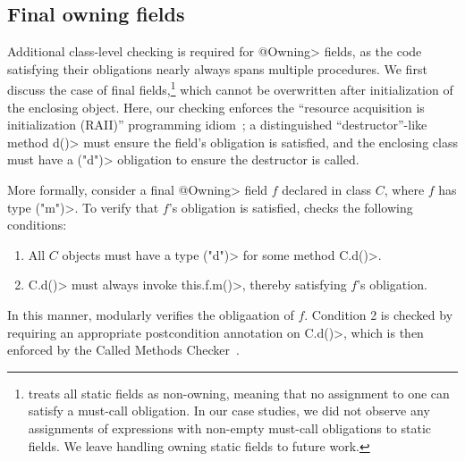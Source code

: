 

\subsection{Final owning fields}
\label{sec:owning-fields}

  Additional class-level checking is required for \<@Owning>
  fields, as the code
  satisfying their \MustCall obligations nearly always spans multiple
  procedures.  We first discuss the case of final fields,\footnote{\Tool
    treats all static fields as non-owning, meaning that no assignment to one
    can satisfy a must-call obligation. In our case studies, we did
    not observe any assignments of expressions with non-empty must-call obligations
    to static fields. We leave handling owning static fields to future work.
  }
  which cannot be overwritten after initialization of the enclosing
  object.  Here, our checking enforces the ``resource acquisition is
  initialization (RAII)'' programming idiom~\cite{raii}; a distinguished
  ``destructor''-like method \<d()> must ensure the field's \MustCall obligation is
  satisfied, and the enclosing class must have a \MustCall\<("d")> obligation to
  ensure the destructor is called.

  More formally, consider a final \<@Owning> field $f$ declared in class $C$,
  where
  $f$ has type \MustCall\<("m")>.  To
  verify that $f$'s \MustCall obligation is satisfied, \Tool checks the following
  conditions:
  \begin{enumerate}
    \item All $C$ objects must have a type \MustCall\<("d")> for some method \<C.d()>.
    \item \<C.d()> must always invoke \<this.f.m()>, thereby satisfying $f$'s
    \MustCall obligation.
  \end{enumerate}
  In this manner, \Tool modularly verifies the \MustCall obligaation of $f$.  Condition 2 is
  checked by requiring an appropriate \EnsuresCalledMethods
  postcondition annotation on
  \<C.d()>, which is then enforced by the Called Methods
  Checker~\cite{KelloggRSSE2020}.   

